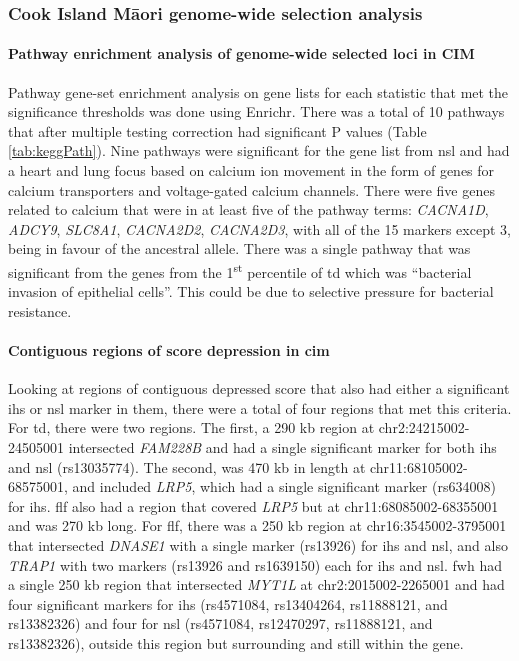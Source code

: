 \documentclass[twoside,openright]{report}
\let\oldparagraph\paragraph
\renewcommand{\paragraph}[1]{\oldparagraph{#1}\mbox{}}
\newcommand{\tex}[1]{#1}
\begin{document}
\FloatBarrier

\subsubsection{\texorpdfstring{Cook Island M\tex{\={a}}ori genome-wide
selection
analysis}{Cook Island Mori genome-wide selection analysis}}\label{cook-island-mori-genome-wide-selection-analysis}

\paragraph{Pathway enrichment analysis of genome-wide selected loci in
CIM}\label{cimPath}

Pathway gene-set enrichment analysis on gene lists for each statistic
that met the significance thresholds was done using Enrichr. There was a
total of 10 pathways that after multiple testing correction had
significant P values (Table \ref{tab:keggPath}). Nine pathways were
significant for the gene list from \gls{nsl} and had a heart and lung
focus based on calcium ion movement in the form of genes for calcium
transporters and voltage-gated calcium channels. There were five genes
related to calcium that were in at least five of the pathway terms:
\emph{CACNA1D}, \emph{ADCY9}, \emph{SLC8A1}, \emph{CACNA2D2},
\emph{CACNA2D3}, with all of the 15 markers except 3, being in favour of
the ancestral allele. There was a single pathway that was significant
from the genes from the 1\textsuperscript{st} percentile of \gls{td}
which was ``bacterial invasion of epithelial cells''. This could be due
to selective pressure for bacterial resistance.

\paragraph{\texorpdfstring{Contiguous regions of score depression in
\gls{cim}}{Contiguous regions of score depression in }}\label{contiguous-regions-of-score-depression-in}

Looking at regions of contiguous depressed score that also had either a
significant \gls{ihs} or \gls{nsl} marker in them, there were a total of
four regions that met this criteria. For \gls{td}, there were two
regions. The first, a 290 kb region at chr2:24215002-24505001
intersected \emph{FAM228B} and had a single significant marker for both
\gls{ihs} and \gls{nsl} (rs13035774). The second, was 470 kb in length
at chr11:68105002-68575001, and included \emph{LRP5}, which had a single
significant marker (rs634008) for \gls{ihs}. \Gls{flf} also had a region
that covered \emph{LRP5} but at chr11:68085002-68355001 and was 270 kb
long. For \gls{flf}, there was a 250 kb region at chr16:3545002-3795001
that intersected \emph{DNASE1} with a single marker (rs13926) for
\gls{ihs} and \gls{nsl}, and also \emph{TRAP1} with two markers (rs13926
and rs1639150) each for \gls{ihs} and \gls{nsl}. \Gls{fwh} had a single
250 kb region that intersected \emph{MYT1L} at chr2:2015002-2265001 and
had four significant markers for \gls{ihs} (rs4571084, rs13404264,
rs11888121, and rs13382326) and four for \gls{nsl} (rs4571084,
rs12470297, rs11888121, and rs13382326), outside this region but
surrounding and still within the gene.
\end{document}

